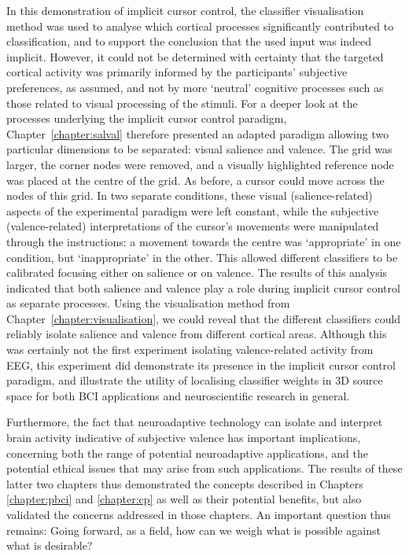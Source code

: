 In this demonstration of implicit cursor control, the classifier visualisation method was used to analyse which cortical processes significantly contributed to classification, and to support the conclusion that the used input was indeed implicit. However, it could not be determined with certainty that the targeted cortical activity was primarily informed by the participants' subjective preferences, as assumed, and not by more `neutral' cognitive processes such as those related to visual processing of the stimuli. For a deeper look at the processes underlying the implicit cursor control paradigm, Chapter~\ref{chapter:salval} therefore presented an adapted paradigm allowing two particular dimensions to be separated: visual salience and valence. The grid was larger, the corner nodes were removed, and a visually highlighted reference node was placed at the centre of the grid. As before, a cursor could move across the nodes of this grid. In two separate conditions, these visual (salience-related) aspects of the experimental paradigm were left constant, while the subjective (valence-related) interpretations of the cursor's movements were manipulated through the instructions: a movement towards the centre was `appropriate' in one condition, but `inappropriate' in the other. This allowed different classifiers to be calibrated focusing either on salience or on valence. The results of this analysis indicated that both salience and valence play a role during implicit cursor control as separate processes. Using the visualisation method from Chapter~\ref{chapter:visualisation}, we could reveal that the different classifiers could reliably isolate salience and valence from different cortical areas. Although this was certainly not the first experiment isolating valence-related activity from EEG, this experiment did demonstrate its presence in the implicit cursor control paradigm, and illustrate the utility of localising classifier weights in 3D source space for both BCI applications and neuroscientific research in general.

Furthermore, the fact that neuroadaptive technology can isolate and interpret brain activity indicative of subjective valence has important implications, concerning both the range of potential neuroadaptive applications, and the potential ethical issues that may arise from such applications. The results of these latter two chapters thus demonstrated the concepts described in Chapters \ref{chapter:pbci} and \ref{chapter:cp} as well as their potential benefits, but also validated the concerns addressed in those chapters. An important question thus remains: Going forward, as a field, how can we weigh what is possible against what is desirable?


